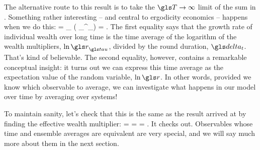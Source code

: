 The alternative route to this result is to take the $\T\to\infty$ limit of the sum in . Something rather interesting -- and central to ergodicity economics -- happens when we do this:
\be
\ggtime = \lim_{\T\to\infty}  \left( \sum_{}^\T \ln\gr_\gtau\right) =  \frac{\ave{\ln\gr}}{\dt}.
\ee
The first equality says that the growth rate of individual wealth over long time is the time average of the logarithm of the wealth multipliers, $\ln\gr_\gtau$, divided by the round duration, $\dt$. That's kind of believable. The second equality, however, contains a remarkable conceptual insight: it turns out we can express this time average as the expectation value of the random variable, $\ln\gr$. In other words, provided we know which observable to average, we can investigate what happens in our model over time by averaging over systems!

To maintain sanity, let's check that this is the same as the result arrived at by finding the effective wealth multiplier:
\be
\ggtime =  =  = \frac{\ln\grtime}{\dt}.
\ee
It checks out. Observables whose time and ensemble averages are equivalent are very special, and we will say much more about them in the next section.

